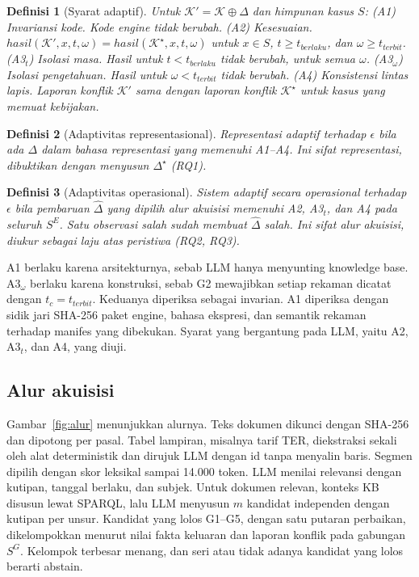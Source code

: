\documentclass[conference]{IEEEtran}
\makeatletter
\DeclareRobustCommand{\en}[1]{{\usefont{\f@encoding}{\f@family}{\f@series}{it}#1\/}}
\newtheorem{definisi}{Definisi}
\newcommand{\K}{\mathcal{K}}
\newcommand{\hasil}{\mathit{hasil}}
\newcommand{\emas}{\star}
\newcommand{\SG}{S^{G}}
\newcommand{\SE}{S^{E}}
\makeatother
\begin{document}
\begin{definisi}[Syarat adaptif]
\label{def:syarat}
Untuk $\K' = \K \oplus \Delta$ dan himpunan kasus $S$:
(A1) Invariansi kode. Kode \en{engine} tidak berubah.
(A2) Kesesuaian. $\hasil(\K', x, t, \omega) = \hasil(\K^{\emas}, x, t, \omega)$ untuk $x \in S$, $t \geq t_{\mathit{berlaku}}$, dan $\omega \geq t_{\mathit{terbit}}$.
(A3$_t$) Isolasi masa. Hasil untuk $t < t_{\mathit{berlaku}}$ tidak berubah, untuk semua $\omega$.
(A3$_\omega$) Isolasi pengetahuan. Hasil untuk $\omega < t_{\mathit{terbit}}$ tidak berubah.
(A4) Konsistensi lintas lapis. Laporan konflik $\K'$ sama dengan laporan konflik $\K^{\emas}$ untuk kasus yang memuat kebijakan.
\end{definisi}

\begin{definisi}[Adaptivitas representasional]
\label{def:adapt-rep}
Representasi adaptif terhadap $\epsilon$ bila \emph{ada} $\Delta$ dalam bahasa representasi yang memenuhi A1--A4. Ini sifat representasi, dibuktikan dengan menyusun $\Delta^{\emas}$ (RQ1).
\end{definisi}

\begin{definisi}[Adaptivitas operasional]
\label{def:adapt-op}
Sistem adaptif secara operasional terhadap $\epsilon$ bila pembaruan $\hat{\Delta}$ yang \emph{dipilih alur akuisisi} memenuhi A2, A3$_t$, dan A4 pada seluruh $\SE$. Satu observasi salah sudah membuat $\hat{\Delta}$ salah. Ini sifat alur akuisisi, diukur sebagai laju atas peristiwa (RQ2, RQ3).
\end{definisi}

A1 berlaku karena arsitekturnya, sebab LLM hanya menyunting \en{knowledge base}. A3$_\omega$ berlaku karena konstruksi, sebab G2 mewajibkan setiap rekaman dicatat dengan $t_c = t_{\mathit{terbit}}$. Keduanya diperiksa sebagai invarian. A1 diperiksa dengan sidik jari SHA-256 paket \en{engine}, bahasa ekspresi, dan semantik rekaman terhadap manifes yang dibekukan. Syarat yang bergantung pada LLM, yaitu A2, A3$_t$, dan A4, yang diuji.

\subsection{Alur akuisisi}
Gambar~\ref{fig:alur} menunjukkan alurnya. Teks dokumen dikunci dengan SHA-256 dan dipotong per pasal. Tabel lampiran, misalnya tarif TER, diekstraksi sekali oleh alat deterministik dan dirujuk LLM dengan id tanpa menyalin baris. Segmen dipilih dengan skor leksikal sampai 14.000 token. LLM menilai relevansi dengan kutipan, tanggal berlaku, dan subjek. Untuk dokumen relevan, konteks KB disusun lewat SPARQL, lalu LLM menyusun $m$ kandidat independen dengan kutipan per unsur. Kandidat yang lolos G1--G5, dengan satu putaran perbaikan, dikelompokkan menurut nilai fakta keluaran dan laporan konflik pada gabungan $\SG$. Kelompok terbesar menang, dan seri atau tidak adanya kandidat yang lolos berarti \en{abstain}.
\end{document}
